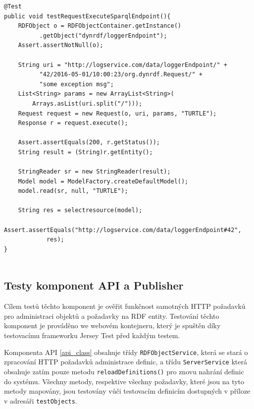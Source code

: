 \documentclass[thesis=B,czech]{FITthesis}[2012/06/26]
\begin{document}
  \begin{lstlisting}[float=htb,caption={Test metody executeSparqlEndpoint()},label=list:test_execute_endpoint]
@Test
public void testRequestExecuteSparqlEndpoint(){
    RDFObject o = RDFObjectContainer.getInstance()
		  .getObject("dynrdf/loggerEndpoint");
    Assert.assertNotNull(o);

    String uri = "http://logservice.com/data/loggerEndpoint/" + 
		  "42/2016-05-01/10:00:23/org.dynrdf.Request/" +
		  "some exception msg";
    List<String> params = new ArrayList<String>(
	    Arrays.asList(uri.split("/")));
    Request request = new Request(o, uri, params, "TURTLE");
    Response r = request.execute();

    Assert.assertEquals(200, r.getStatus());
    String result = (String)r.getEntity();

    StringReader sr = new StringReader(result);
    Model model = ModelFactory.createDefaultModel();
    model.read(sr, null, "TURTLE");

    String res = selectresource(model);
    Assert.assertEquals("http://logservice.com/data/loggerEndpoint#42",
			res);
}
    
\end{lstlisting}

\subsection{Testy komponent API a Publisher}
Cílem testů těchto komponent je ověřit funkčnost samotných HTTP požadavků pro administraci objektů a požadavky na RDF entity.
Testování těchto komponent je prováděno we webovém kontejneru, který je spuštěn díky
testovacímu frameworku Jersey Test \cite{jersey_test} před každým testem.

Komponenta API \ref{api_class} obsahuje třídy \texttt{RDFObjectService}, která se stará o zpracování HTTP požadavků administrace definic,
a třídu \texttt{ServerService} která obsahuje zatím pouze metodu \texttt{reloadDefinitions()} pro znovu nahrání definic do systému.
Všechny metody, respektive všechny požadavky, které jsou na tyto metody mapovány, jsou testovány vůči testovacím definicím dostupných v příloze
v adresáři \texttt{testObjects}. 
\end{document}
